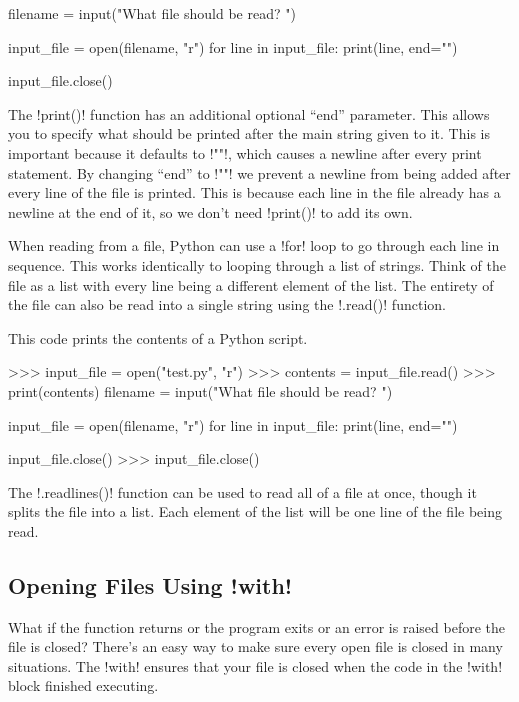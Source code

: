 \documentclass[11pt]{cselabheader}
\begin{document}
\begin{python3code}
filename = input("What file should be read? ")

input_file = open(filename, "r")
for line in input_file:
    print(line, end="")

input_file.close()
\end{python3code}

The \pythoninline!print()! function has an additional optional ``end''
parameter. This allows you to specify what should be printed after the main
string given to it. This is important because it defaults to
\pythoninline!"\n"!, which causes a newline after every print statement. By
changing ``end'' to \pythoninline!""! we prevent a newline from being added
after every line of the file is printed. This is because each line in the
file already has a newline at the end of it, so we don't need
\pythoninline!print()! to add its own.

When reading from a file, Python can use a \pythoninline!for! loop to go
through each line in sequence. This works identically to looping through a list
of strings. Think of the file as a list with every line being a different
element of the list. The entirety of the file can also be read into a single
string using the \pythoninline!.read()! function.


This code prints the contents of a Python script.

\begin{pyconcode}
>>> input_file = open("test.py", "r")
>>> contents = input_file.read()
>>> print(contents)
filename = input("What file should be read? ")

input_file = open(filename, "r")
for line in input_file:
    print(line, end="")

input_file.close()
>>> input_file.close()
\end{pyconcode}

The \pythoninline!.readlines()! function can be used to read all of a file at
once, though it splits the file into a list. Each element of the list will be
one line of the file being read.

\subsection{Opening Files Using \protect\pythoninline!with!}
\label{sec:with}

What if the function returns or the program exits or an error is raised before the file is closed?
There's an easy way to make sure every open file is closed in many situations. 
The \pythoninline!with! ensures that your file is closed when the code in the
\pythoninline!with! block finished executing.
\end{document}
